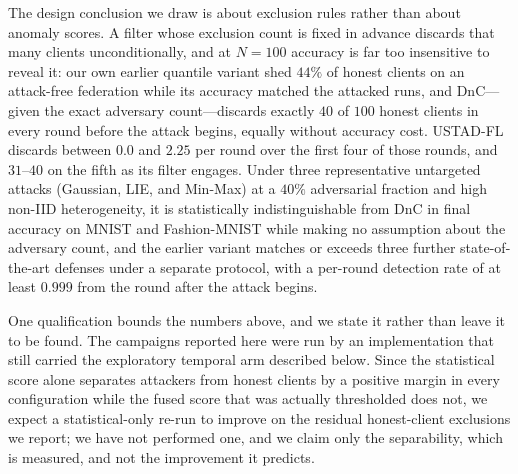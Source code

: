 \documentclass[journal]{IEEEtran}
\begin{document}
The design conclusion we draw is about exclusion rules rather than about anomaly scores. A filter whose exclusion count is fixed in advance discards that many clients unconditionally, and at $N=100$ accuracy is far too insensitive to reveal it: our own earlier quantile variant shed $44\%$ of honest clients on an attack-free federation while its accuracy matched the attacked runs, and DnC---given the exact adversary count---discards exactly $40$ of $100$ honest clients in every round before the attack begins, equally without accuracy cost. USTAD-FL discards between $0.0$ and $2.25$ per round over the first four of those rounds, and $31$--$40$ on the fifth as its filter engages. Under three representative untargeted attacks (Gaussian, LIE, and Min-Max) at a $40\%$ adversarial fraction and high non-IID heterogeneity, it is statistically indistinguishable from DnC in final accuracy on MNIST and Fashion-MNIST while making no assumption about the adversary count, and the earlier variant matches or exceeds three further state-of-the-art defenses under a separate protocol, with a per-round detection rate of at least $0.999$ from the round after the attack begins.

One qualification bounds the numbers above, and we state it rather than leave it to be found. The campaigns reported here were run by an implementation that still carried the exploratory temporal arm described below. Since the statistical score alone separates attackers from honest clients by a positive margin in every configuration while the fused score that was actually thresholded does not, we expect a statistical-only re-run to improve on the residual honest-client exclusions we report; we have not performed one, and we claim only the separability, which is measured, and not the improvement it predicts.
\end{document}
